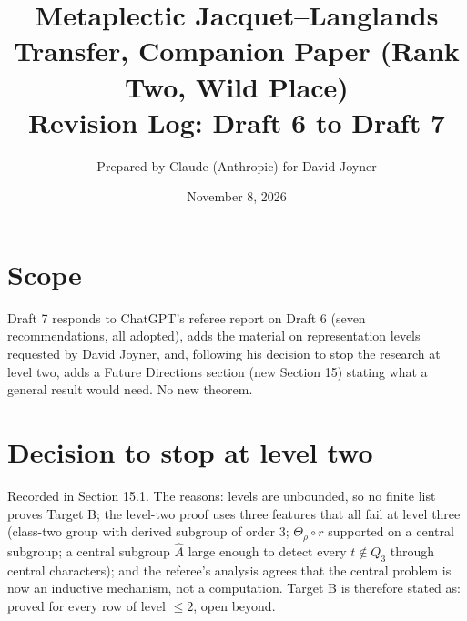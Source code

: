 \documentclass[11pt]{article}
\title{Metaplectic Jacquet--Langlands Transfer, Companion Paper (Rank Two, Wild Place)\\Revision Log: Draft 6 to Draft 7}
\author{Prepared by Claude (Anthropic) for David Joyner}
\date{November 8, 2026}
\begin{document}
\maketitle
\section*{Scope}
Draft 7 responds to ChatGPT's referee report on Draft 6 (seven
recommendations, all adopted), adds the material on representation
levels requested by David Joyner, and, following his decision to stop
the research at level two, adds a Future Directions section (new
Section 15) stating what a general result would need.  No new theorem.

\section*{Decision to stop at level two}
Recorded in Section 15.1.  The reasons: levels are unbounded, so no
finite list proves Target B; the level-two proof uses three features
that all fail at level three (class-two group with derived subgroup of
order $3$; $\Theta_\rho\circ r$ supported on a central subgroup; a
central subgroup $\hat A$ large enough to detect every $t\notin Q_3$ through
central characters); and the referee's analysis agrees that the central
problem is now an inductive mechanism, not a computation.  Target B is
therefore stated as: proved for every row of level $\le2$, open beyond.
\end{document}

